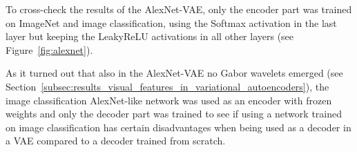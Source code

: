 To cross-check the results of the AlexNet-VAE, only the encoder part was trained on ImageNet and image classification, using the Softmax activation in the last layer but keeping the \ac{LeakyReLU} activations in all other layers (see Figure~\ref{fig:alexnet}).

As it turned out that also in the AlexNet-VAE no Gabor wavelets emerged (see Section~\ref{subsec:results_visual_features_in_variational_autoencoders}), the image classification AlexNet-like network was used as an encoder with frozen weights and only the decoder part was trained to see if using a network trained on image classification has certain disadvantages when being used as a decoder in a \ac{VAE} compared to a decoder trained from scratch.
